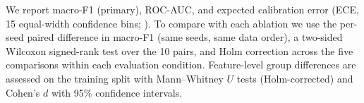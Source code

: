 We report macro-F1 (primary), ROC-AUC, and expected calibration error (ECE, 15 equal-width confidence
bins; \citealp{naeini2015ece}). To compare \menet{} with each ablation we use the per-seed paired
difference in macro-F1 (same seeds, same data order), a two-sided Wilcoxon signed-rank test over the 10
pairs, and Holm correction \citep{holm1979} across the five comparisons within each evaluation condition.
Feature-level group differences are assessed on the training split with Mann--Whitney $U$ tests
(Holm-corrected) and Cohen's $d$ with 95\% confidence intervals.
